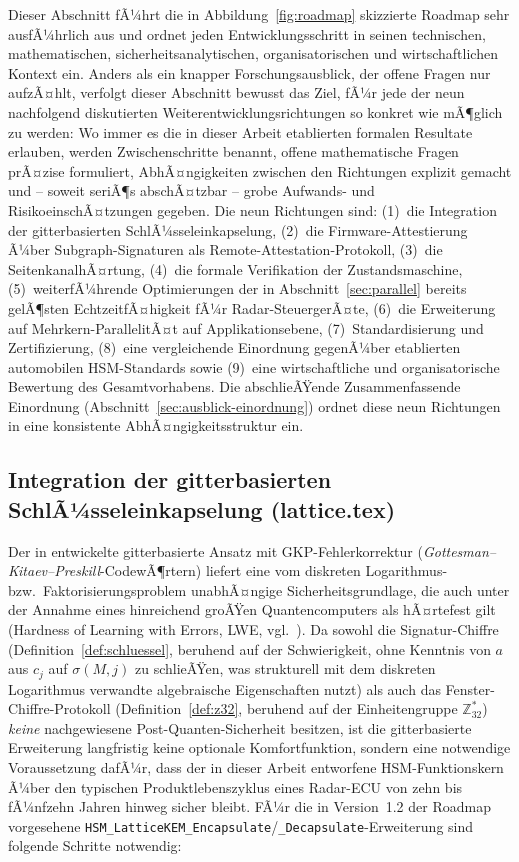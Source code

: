 ﻿\documentclass[a4paper,12pt]{article}
\theoremstyle{definition}
\begin{document}
Dieser Abschnitt fÃ¼hrt die in Abbildung~\ref{fig:roadmap} skizzierte Roadmap sehr ausfÃ¼hrlich aus und ordnet jeden Entwicklungsschritt in seinen technischen, mathematischen, sicherheitsanalytischen, organisatorischen und wirtschaftlichen Kontext ein. Anders als ein knapper Forschungsausblick, der offene Fragen nur aufzÃ¤hlt, verfolgt dieser Abschnitt bewusst das Ziel, fÃ¼r jede der neun nachfolgend diskutierten Weiterentwicklungsrichtungen so konkret wie mÃ¶glich zu werden: Wo immer es die in dieser Arbeit etablierten formalen Resultate erlauben, werden Zwischenschritte benannt, offene mathematische Fragen prÃ¤zise formuliert, AbhÃ¤ngigkeiten zwischen den Richtungen explizit gemacht und -- soweit seriÃ¶s abschÃ¤tzbar -- grobe Aufwands- und RisikoeinschÃ¤tzungen gegeben. Die neun Richtungen sind: (1)~die Integration der gitterbasierten SchlÃ¼sseleinkapselung, (2)~die Firmware-Attestierung Ã¼ber Subgraph-Signaturen als Remote-Attestation-Protokoll, (3)~die SeitenkanalhÃ¤rtung, (4)~die formale Verifikation der Zustandsmaschine, (5)~weiterfÃ¼hrende Optimierungen der in Abschnitt~\ref{sec:parallel} bereits gelÃ¶sten EchtzeitfÃ¤higkeit fÃ¼r Radar-SteuergerÃ¤te, (6)~die Erweiterung auf Mehrkern-ParallelitÃ¤t auf Applikationsebene, (7)~Standardisierung und Zertifizierung, (8)~eine vergleichende Einordnung gegenÃ¼ber etablierten automobilen HSM-Standards sowie (9)~eine wirtschaftliche und organisatorische Bewertung des Gesamtvorhabens. Die abschlieÃŸende Zusammenfassende Einordnung (Abschnitt~\ref{sec:ausblick-einordnung}) ordnet diese neun Richtungen in eine konsistente AbhÃ¤ngigkeitsstruktur ein.

\subsection{Integration der gitterbasierten SchlÃ¼sseleinkapselung (lattice.tex)}

Der in \cite{Epp26d} entwickelte gitterbasierte Ansatz mit GKP-Fehlerkorrektur (\emph{Gottesman--Kitaev--Preskill}-CodewÃ¶rtern) liefert eine vom diskreten Logarithmus- bzw.\ Faktorisierungsproblem unabhÃ¤ngige Sicherheitsgrundlage, die auch unter der Annahme eines hinreichend groÃŸen Quantencomputers als hÃ¤rtefest gilt (Hardness of Learning with Errors, LWE, vgl.\ \cite{Regev09}). Da sowohl die Signatur-Chiffre (Definition~\ref{def:schluessel}, beruhend auf der Schwierigkeit, ohne Kenntnis von $a$ aus $c_j$ auf $\sigma(M,j)$ zu schlieÃŸen, was strukturell mit dem diskreten Logarithmus verwandte algebraische Eigenschaften nutzt) als auch das Fenster-Chiffre-Protokoll (Definition~\ref{def:z32}, beruhend auf der Einheitengruppe $\mathbb{Z}_{32}^*$) \emph{keine} nachgewiesene Post-Quanten-Sicherheit besitzen, ist die gitterbasierte Erweiterung langfristig keine optionale Komfortfunktion, sondern eine notwendige Voraussetzung dafÃ¼r, dass der in dieser Arbeit entworfene HSM-Funktionskern Ã¼ber den typischen Produktlebenszyklus eines Radar-ECU von zehn bis fÃ¼nfzehn Jahren hinweg sicher bleibt. FÃ¼r die in Version~1.2 der Roadmap vorgesehene \texttt{HSM\_LatticeKEM\_Encapsulate}/\texttt{\_Decapsulate}-Erweiterung sind folgende Schritte notwendig:
\end{document}
